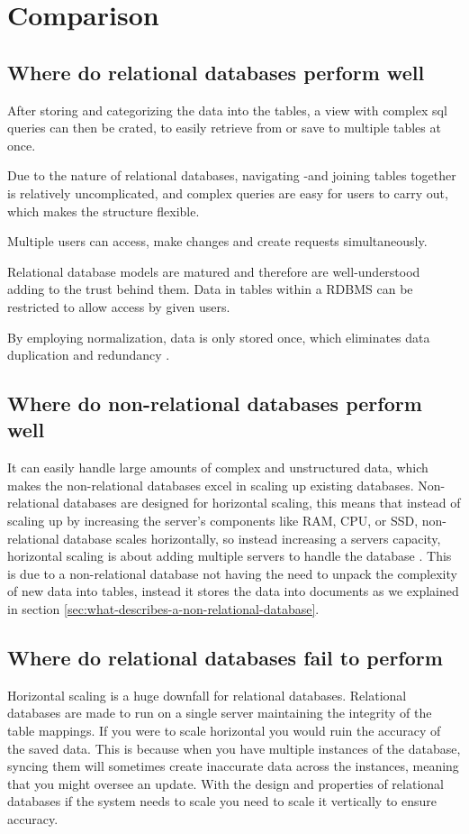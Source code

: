 \section{Comparison}

\subsection{Where do relational databases perform well}
After storing and categorizing the data into the tables, a view with complex sql queries can then be crated, to easily retrieve from or save to multiple tables at once.

Due to the nature of relational databases, navigating -and joining tables together is relatively uncomplicated, and complex queries are easy for users to carry out, which makes the structure flexible.

Multiple users can access, make changes and create requests simultaneously.

Relational database models are matured and therefore are well-understood adding to the trust behind them. Data in tables within a RDBMS can be restricted to allow access by given users.

By employing normalization, data is only stored once, which eliminates data duplication and redundancy \parencite{microsoft-normaliziation}.

\subsection{Where do non-relational databases perform well}
It can easily handle large amounts of complex and unstructured data, which makes the non-relational databases excel in scaling up existing databases.
Non-relational databases are designed for horizontal scaling, this means that instead of scaling up by increasing the server's components like RAM, CPU, or SSD, non-relational database scales horizontally, so instead increasing a servers capacity, horizontal scaling is about adding multiple servers to handle the database \parencite{mongodb-advantages-of-nosql}.
This is due to a non-relational database not having the need to unpack the complexity of new data into tables, instead it stores the data into documents as we explained in section \ref{sec:what-describes-a-non-relational-database}.


\subsection{Where do relational databases fail to perform}
Horizontal scaling is a huge downfall for relational databases. Relational databases are made to run on a single server maintaining the integrity of the table mappings. If you were to scale horizontal you would ruin the accuracy of the saved data. This is because when you have multiple instances of the database, syncing them will sometimes create inaccurate data across the instances, meaning that you might oversee an update.
With the design and properties of relational databases if the system needs to scale you need to scale it vertically to ensure accuracy. \parencite{loginradius-rdbms-vs-nosql}

